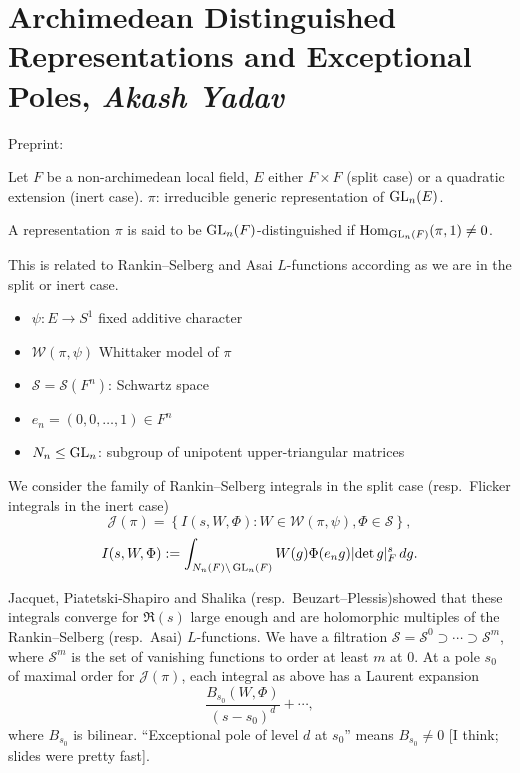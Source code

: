 \documentclass[reqno]{amsart} 
\begin{document}
\section{Archimedean Distinguished Representations and Exceptional Poles, \textnormal{\emph{
      Akash Yadav}}}

Preprint: \cite{2024arXiv2401.09063}

Let $F$ be a non-archimedean local field, $E$ either $F \times F$ (split case) or a quadratic extension (inert case).  $\pi$: irreducible generic representation of $\operatorname{GL}_n(E)$.

\begin{definition}
  A representation $\pi$ is said to be $\operatorname{GL}_n(F)$-distinguished if $\operatorname{Hom}_{\operatorname{GL}_n(F)}(\pi,1) \neq 0$.
\end{definition}
This is related to Rankin--Selberg and Asai $L$-functions according as we are in the split or inert case.

\begin{itemize}
\item $\psi : E \rightarrow S^1$ fixed additive character
\item $\mathcal{W}(\pi, \psi)$ Whittaker model of $\pi$ 
\item $\mathcal{S} = \mathcal{S}(F^n)$: Schwartz space
\item $e_n =(0, 0, \dotsc, 1) \in F^n$
\item $N_n \leq \operatorname{GL}_n$: subgroup of unipotent upper-triangular matrices
\end{itemize}
We consider the family of Rankin--Selberg integrals in the split case (resp.\ Flicker integrals in the inert case)
\begin{equation*}
  \mathcal{J}(\pi) = \left\{ I(s, W, \Phi) : W \in \mathcal{W}(\pi, \psi), \Phi \in \mathcal{S} \right\},
\end{equation*}
\begin{equation*}
  I(s, W, \Phi) := \int_{N_n(F) \backslash \operatorname{GL}_n(F)} W(g)
  \Phi(e_n g)
  \lvert \det g \rvert^s_F \, d g.
\end{equation*}

Jacquet, Piatetski-Shapiro and Shalika (resp.\ Beuzart--Plessis)showed that these integrals converge for $\Re(s)$ large enough and are holomorphic multiples of the Rankin--Selberg (resp.\ Asai) $L$-functions.  We have a filtration $\mathcal{S} = \mathcal{S}^0 \supset \dotsb \supset \mathcal{S} ^m$, where $\mathcal{S}^m$ is the set of vanishing functions to order at least $m$ at $0$.  At a pole $s_0$ of maximal order for $\mathcal{J}(\pi)$, each integral as above has a Laurent expansion
\begin{equation}\label{eq:cnojsuo68y}
  \frac{B_{s_0}(W, \Phi)}{(s - s_0)^d} + \dotsb,
\end{equation}
where $B_{s_0}$ is bilinear.  ``Exceptional pole of level $d$ at $s_0$'' means $B_{s_0} \neq 0$ [I think; slides were pretty fast].
\end{document}
